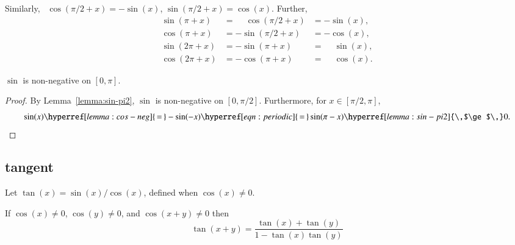 Similarly,~%
$\cos(\pi/2 + x) =
-\sin(x)$, $\sin(\pi/2 + x) = \cos(x)$.  Further,
\begin{equation}\label{eqn:periodic}
\begin{array}{lll}
\sin(\pi + x) &= \phantom{-}\cos(\pi/2 + x) &= -\sin(x),\\
\cos(\pi + x) &= -\sin(\pi/2 + x) &= -\cos(x),\\
\sin(2\pi + x) &= -\sin(\pi + x) &= \phantom{-}\sin(x),\\
\cos(2\pi + x) &= -\cos(\pi + x) &= \phantom{-}\cos(x).
\end{array}
\end{equation}
%
%
%

\begin{lemma}[]\label{lemma:sin-pos}
$\sin$ is non-negative on $[0,\pi]$.
\end{lemma}

\begin{proof} By Lemma~\ref{lemma:sin-pi2}, $\sin$ is non-negative on
  $[0,\pi/2]$.  Furthermore, for $x\in[\pi/2,\pi]$,
\begin{displaymath}
  \sin(x) \hyperref[lemma:cos-neg]{\,=\,} -\sin(-x) 
  \hyperref[eqn:periodic]{\,=\,}  \sin(\pi-x) \hyperref[lemma:sin-pi2]{\,$\ge$\,} 0.
\end{displaymath}
\end{proof}



\subsection{tangent}
\label{sec:tangent}

\begin{definition}[tangent]\label{def:tan}
Let $\tan(x) = \sin(x)/\cos(x)$, defined when $\cos(x)\ne0$.
%
%
\end{definition}


\begin{lemma}[]
\label{lemma:tan-add}
If $\cos(x)\ne 0$, $\cos(y)\ne 0$, and $\cos(x+y)\ne0$ then
\begin{displaymath}\tan(x+y) = \frac{\tan(x) + \tan(y) }{ 1 -
    \tan(x)\tan(y)}\end{displaymath}
\end{lemma}
%

